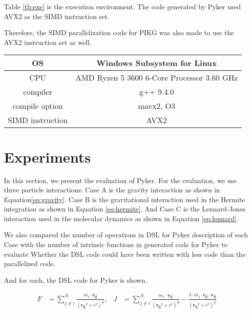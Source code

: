 \documentclass[ams]{article}
\begin{document}
Table \ref{tb:exe} is the execution environment.
The code generated by Pyker used AVX2 as the SIMD instruction set.

Therefore, the SIMD parallelization code for PIKG was also made to use the AVX2 instruction set as well.

			\begin{table*}[htb]
                    \centering
				\caption{Execution Environment}
				\label{tb:exe}
				\begin{tabular}{|c||c|} \hline
					OS & Windows Subsystem for Linux  \\ \hline 
					CPU & AMD Ryzen 5 3600 6-Core Processor 3.60 GHz \\ \hline
                        compiler & g++ 9.4.0 \\ \hline
					compile option & mavx2, O3   \\ \hline
					SIMD instruction & AVX2  \\ \hline
				\end{tabular}
			\end{table*}


\section{Experiments}
In this section, we present the evaluation of Pyker. For the evaluation, we use three particle interactions: Case A is the gravity interaction as shown in Equation\eqref{eq:gravity}. 
Case B is the gravitational interaction used in the Hermite integration as shown in Equation \ref{eq:hermite}, And Case C is the Lennard-Jones interaction used in the molecular dynamics as shown in Equation \ref{eq:lennard}.


We also compared the number of operations in DSL for Pyker description of each Case with the number of intrinsic functions in generated code for Pyker to evaluate Whether the DSL code could have been written with less code than the parallelized code.

And for each, the DSL code for Pyker is shown.

\begin{align}\label{eq:hermite}
F &= \sum\limits_{j\neq i}^N \frac{m_j \cdot \mathbf{r_{ij}}}{\left( \mathbf{r_{ij}}^2 + \epsilon^2\right)^{\frac{3}{2}}}, &
J &= \sum\limits_{j\neq i}^N \frac{m_j \cdot \mathbf{v_{ij}}}{\left( \mathbf{r_{ij}}^2 + \epsilon^2 \right)^{\frac{3}{2}}} - \frac{3 \cdot m_j \cdot \mathbf{r_{ij}} \cdot \mathbf{v_{ij}}}{\left( \mathbf{r_{ij}}^2 + \epsilon^2 \right)^{\frac{5}{2}}}
\end{align}
\end{document}
